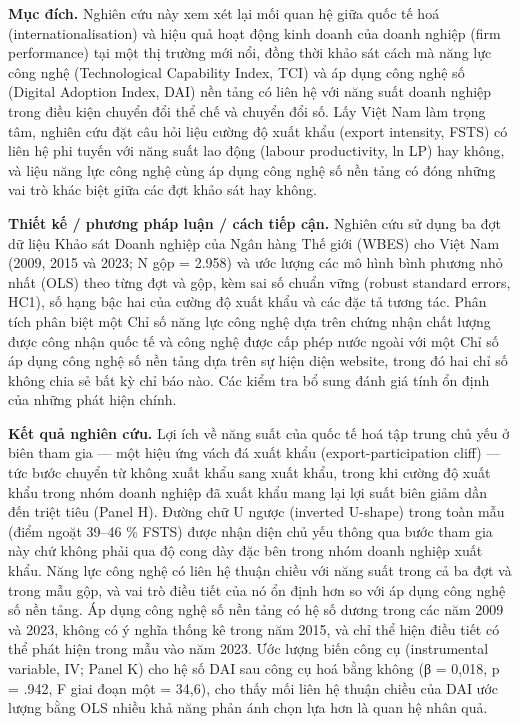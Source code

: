 \documentclass[12pt,a4paper]{article}
\begin{document}
\textbf{Mục đích.} Nghiên cứu này xem xét lại mối quan hệ giữa quốc tế
hoá (internationalisation) và hiệu quả hoạt động kinh doanh của doanh
nghiệp (firm performance) tại một thị trường mới nổi, đồng thời khảo sát
cách mà năng lực công nghệ (Technological Capability Index, TCI) và áp
dụng công nghệ số (Digital Adoption Index, DAI) nền tảng có liên hệ với
năng suất doanh nghiệp trong điều kiện chuyển đổi thể chế và chuyển đổi
số. Lấy Việt Nam làm trọng tâm, nghiên cứu đặt câu hỏi liệu cường độ
xuất khẩu (export intensity, FSTS) có liên hệ phi tuyến với năng suất
lao động (labour productivity, ln LP) hay không, và liệu năng lực công
nghệ cùng áp dụng công nghệ số nền tảng có đóng những vai trò khác biệt
giữa các đợt khảo sát hay không.

\textbf{Thiết kế / phương pháp luận / cách tiếp cận.} Nghiên cứu sử dụng
ba đợt dữ liệu Khảo sát Doanh nghiệp của Ngân hàng Thế giới (WBES) cho
Việt Nam (2009, 2015 và 2023; N gộp = 2.958) và ước lượng các mô hình
bình phương nhỏ nhất (OLS) theo từng đợt và gộp, kèm sai số chuẩn vững
(robust standard errors, HC1), số hạng bậc hai của cường độ xuất khẩu và
các đặc tả tương tác. Phân tích phân biệt một Chỉ số năng lực công nghệ
dựa trên chứng nhận chất lượng được công nhận quốc tế và công nghệ được
cấp phép nước ngoài với một Chỉ số áp dụng công nghệ số nền tảng dựa
trên sự hiện diện website, trong đó hai chỉ số không chia sẻ bất kỳ chỉ
báo nào. Các kiểm tra bổ sung đánh giá tính ổn định của những phát hiện
chính.

\textbf{Kết quả nghiên cứu.} Lợi ích về năng suất của quốc tế hoá tập
trung chủ yếu ở biên tham gia --- một hiệu ứng vách đá xuất khẩu
(export-participation cliff) --- tức bước chuyển từ không xuất khẩu sang
xuất khẩu, trong khi cường độ xuất khẩu trong nhóm doanh nghiệp đã xuất
khẩu mang lại lợi suất biên giảm dần đến triệt tiêu (Panel H). Đường chữ
U ngược (inverted U-shape) trong toàn mẫu (điểm ngoặt 39--46 \% FSTS)
được nhận diện chủ yếu thông qua bước tham gia này chứ không phải qua độ
cong dày đặc bên trong nhóm doanh nghiệp xuất khẩu. Năng lực công nghệ
có liên hệ thuận chiều với năng suất trong cả ba đợt và trong mẫu gộp,
và vai trò điều tiết của nó ổn định hơn so với áp dụng công nghệ số nền
tảng. Áp dụng công nghệ số nền tảng có hệ số dương trong các năm 2009 và
2023, không có ý nghĩa thống kê trong năm 2015, và chỉ thể hiện điều
tiết có thể phát hiện trong mẫu vào năm 2023. Ước lượng biến công cụ
(instrumental variable, IV; Panel K) cho hệ số DAI sau công cụ hoá bằng
không (β = 0,018, p = .942, F giai đoạn một = 34,6), cho thấy mối liên
hệ thuận chiều của DAI ước lượng bằng OLS nhiều khả năng phản ánh chọn
lựa hơn là quan hệ nhân quả.
\end{document}
